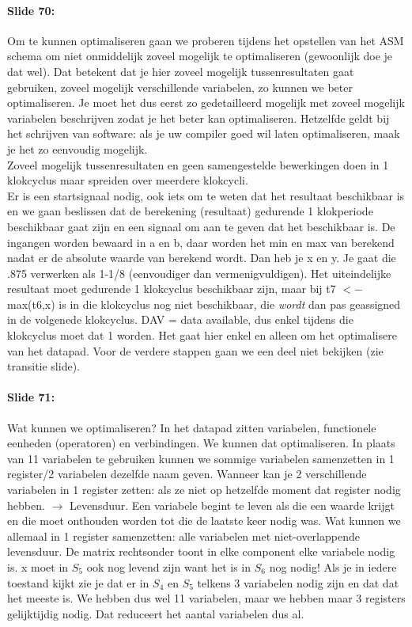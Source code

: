 \documentclass[10pt,a4paper]{book}
\begin{document}
\paragraph{Slide 70:} Om te kunnen optimaliseren gaan we proberen tijdens het opstellen van het ASM schema om niet onmiddelijk zoveel mogelijk te optimaliseren (gewoonlijk doe je dat wel). Dat betekent dat je hier zoveel mogelijk tussenresultaten gaat gebruiken, zoveel mogelijk verschillende variabelen, zo kunnen we beter optimaliseren. Je moet het dus eerst zo gedetailleerd mogelijk met zoveel mogelijk variabelen beschrijven zodat je het beter kan optimaliseren. Hetzelfde geldt bij het schrijven van software: als je uw compiler goed wil laten optimaliseren, maak je het zo eenvoudig mogelijk.\\
Zoveel mogelijk tussenresultaten en geen samengestelde bewerkingen doen in 1 klokcyclus maar spreiden over meerdere klokcycli.\\
Er is een startsignaal nodig, ook iets om te weten dat het resultaat beschikbaar is en we gaan beslissen dat de berekening (resultaat) gedurende 1 klokperiode beschikbaar gaat zijn en een signaal om aan te geven dat het beschikbaar is. De ingangen worden bewaard in a en b, daar worden het min en max van berekend nadat er de absolute waarde van berekend wordt. Dan heb je x en y. Je gaat die .875 verwerken als 1-1/8 (eenvoudiger dan vermenigvuldigen). Het uiteindelijke resultaat moet gedurende 1 klokcyclus beschikbaar zijn, maar bij t7 $<-$ max(t6,x) is in die klokcyclus nog niet beschikbaar, die \emph{wordt} dan pas geassigned in de volgenede klokcyclus. DAV = data available, dus enkel tijdens die klokcyclus moet dat 1 worden. Het gaat hier enkel en alleen om het optimalisere van het datapad. Voor de verdere stappen gaan we een deel niet bekijken (zie transitie slide).

\paragraph{Slide 71:} Wat kunnen we optimaliseren? In het datapad zitten variabelen, functionele eenheden (operatoren) en verbindingen. We kunnen dat optimaliseren. In plaats van 11 variabelen te gebruiken kunnen we sommige variabelen samenzetten in 1 register/2 variabelen dezelfde naam geven. Wanneer kan je 2 verschillende variabelen in 1 register zetten: als ze niet op hetzelfde moment dat register nodig hebben. $\rightarrow$ Levensduur. Een variabele begint te leven als die een waarde krijgt en die moet onthouden worden tot die de laatste keer nodig was. Wat kunnen we allemaal in 1 register samenzetten: alle variabelen met niet-overlappende levensduur. De matrix rechtsonder toont in elke component elke variabele nodig is. x moet in $S_5$ ook nog levend zijn want het is in $S_6$ nog nodig!
Als je in iedere toestand kijkt zie je dat er in $S_4$ en $S_5$ telkens 3 variabelen nodig zijn en dat dat het meeste is. We hebben dus wel 11 variabelen, maar we hebben maar 3 registers gelijktijdig nodig. Dat reduceert het aantal variabelen dus al.
\end{document}
